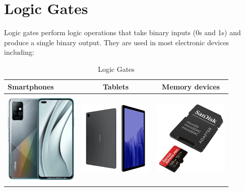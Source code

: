\documentclass{article}
\begin{document}
		\section*{Logic Gates}
		Logic gates perform logic operations that take binary inputs (0s and 1s) and produce a single binary output. They are used in most electronic devices including:
		\begin{table}[h!]
			\begin{center}
				\caption{Logic Gates}
				\label{tab:table1}
				\begin{tabular}{|l|c|c|}
					\hline
					Smartphones & Tablets & Memory devices \\
					\hline
					\includegraphics[width=0.2\linewidth]{phone.png} & \includegraphics[width=0.25\linewidth]{tablet.png} & \includegraphics[width=0.2\linewidth]{memcard.png} \\
					\hline
				\end{tabular}
			\end{center}
		\end{table}
	
\end{document}
